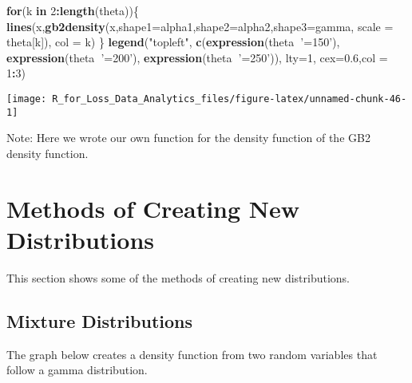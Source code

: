 \documentclass[]{book}
\newenvironment{Shaded}{\begin{snugshade}}{\end{snugshade}}
\newcommand{\KeywordTok}[1]{\textcolor[rgb]{0.13,0.29,0.53}{\textbf{#1}}}
\newcommand{\DataTypeTok}[1]{\textcolor[rgb]{0.13,0.29,0.53}{#1}}
\newcommand{\DecValTok}[1]{\textcolor[rgb]{0.00,0.00,0.81}{#1}}
\newcommand{\FloatTok}[1]{\textcolor[rgb]{0.00,0.00,0.81}{#1}}
\newcommand{\StringTok}[1]{\textcolor[rgb]{0.31,0.60,0.02}{#1}}
\newcommand{\ControlFlowTok}[1]{\textcolor[rgb]{0.13,0.29,0.53}{\textbf{#1}}}
\newcommand{\OperatorTok}[1]{\textcolor[rgb]{0.81,0.36,0.00}{\textbf{#1}}}
\newcommand{\NormalTok}[1]{#1}
\theoremstyle{definition}
\theoremstyle{definition}
\theoremstyle{definition}
\theoremstyle{remark}
\begin{document}
\begin{Shaded}
\begin{Highlighting}[]
\ControlFlowTok{for}\NormalTok{(k }\ControlFlowTok{in} \DecValTok{2}\OperatorTok{:}\KeywordTok{length}\NormalTok{(theta))\{}
  \KeywordTok{lines}\NormalTok{(x,}\KeywordTok{gb2density}\NormalTok{(x,}\DataTypeTok{shape1=}\NormalTok{alpha1,}\DataTypeTok{shape2=}\NormalTok{alpha2,}\DataTypeTok{shape3=}\NormalTok{gamma, }\DataTypeTok{scale =}\NormalTok{ theta[k]), }\DataTypeTok{col =}\NormalTok{ k)}
\NormalTok{\}}
\KeywordTok{legend}\NormalTok{(}\StringTok{"topleft"}\NormalTok{, }\KeywordTok{c}\NormalTok{(}\KeywordTok{expression}\NormalTok{(theta}\OperatorTok{~}\StringTok{'=150'}\NormalTok{), }\KeywordTok{expression}\NormalTok{(theta}\OperatorTok{~}\StringTok{'=200'}\NormalTok{), }\KeywordTok{expression}\NormalTok{(theta}\OperatorTok{~}\StringTok{'=250'}\NormalTok{)), }\DataTypeTok{lty=}\DecValTok{1}\NormalTok{, }\DataTypeTok{cex=}\FloatTok{0.6}\NormalTok{,}\DataTypeTok{col =} \DecValTok{1}\OperatorTok{:}\DecValTok{3}\NormalTok{)}
\end{Highlighting}
\end{Shaded}

\begin{center}\texttt{[image: R\_for\_Loss\_Data\_Analytics\_files/figure-latex/unnamed-chunk-46-1]} \end{center}

Note: Here we wrote our own function for the density function of the GB2
density function.

\section{Methods of Creating New
Distributions}\label{methods-of-creating-new-distributions}

This section shows some of the methods of creating new distributions.

\subsection{Mixture Distributions}\label{mixture-distributions}

The graph below creates a density function from two random variables
that follow a gamma distribution.
\end{document}
